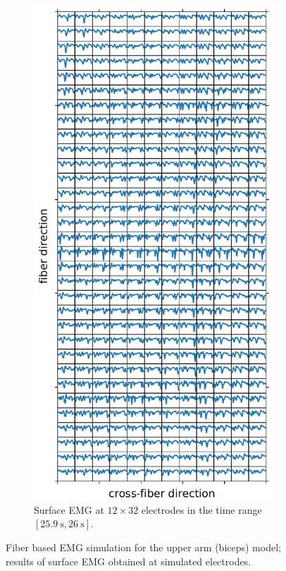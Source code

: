 \begin{figure}
\begin{subfigure}[t]{0.38\textwidth}
    \includegraphics[width=\textwidth]{images/results/application/emg_video_plot.pdf}%
    \caption{Surface EMG at $12 \times 32$ electrodes in the time range $[\SI{25.9}{\s},\SI{26}{\s}]$.}%
    \label{fig:emg_video_plot}%
  \end{subfigure}
  \caption{Fiber based EMG simulation for the upper arm (biceps) model; results of surface EMG obtained at simulated electrodes.}%
  \label{fig:emg_video}%
\end{figure}




